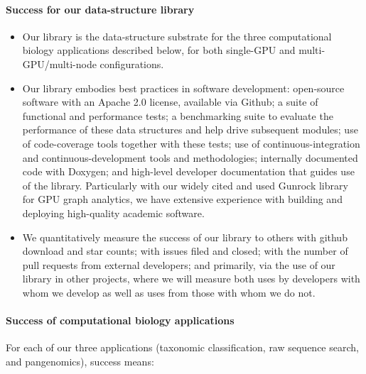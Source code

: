 \noindent
\paragraph{Success for our data-structure library}

\label{sec:sw-methodology}

\begin{itemize}[noitemsep]
  \item Our library is the data-structure substrate for the three computational biology applications described below, for both single-GPU and multi-GPU/multi-node configurations.
  \item Our library embodies best practices in software development: open-source software with an Apache 2.0 license, available via Github; a suite of functional and performance tests; a benchmarking suite to evaluate the performance of these data structures and help drive subsequent modules; use of code-coverage tools together with these tests; use of continuous-integration and continuous-development tools and methodologies; internally documented code with Doxygen; and high-level developer documentation that guides use of the library. Particularly with our widely cited and used Gunrock library~\cite{Wang:2017:GGG} for GPU graph analytics, we have extensive experience with building and deploying high-quality academic software.
  \item We quantitatively measure the success of our library to others with github download and star counts; with issues filed and closed; with the number of pull requests from external developers; and primarily, via the use of our library in other projects, where we will measure both uses by developers with whom we develop as well as uses from those with whom we do not.
\end{itemize}

\paragraph{Success of computational biology applications}

For each of our three applications (taxonomic classification, raw sequence search, and pangenomics), success means:

